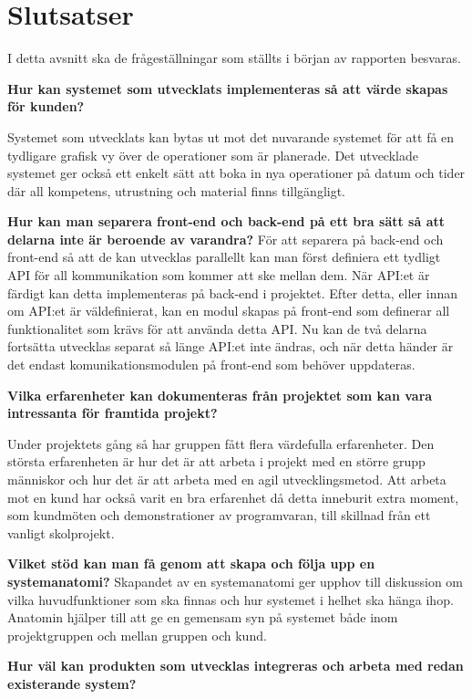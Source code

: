 \chapter{Slutsatser}
I detta avsnitt ska de frågeställningar som ställts i början av rapporten besvaras.

\textbf{Hur kan systemet som utvecklats implementeras så att värde skapas för kunden?}

Systemet som utvecklats kan bytas ut mot det nuvarande systemet för att få en tydligare grafisk vy över de operationer som är planerade. Det utvecklade systemet ger också ett enkelt sätt att boka in nya operationer på datum och tider där all kompetens, utrustning och material finns tillgängligt.

\textbf{Hur kan man separera front-end och back-end på ett bra sätt så att delarna inte är beroende av varandra?}
För att separera på back-end och front-end så att de kan utvecklas parallellt kan man först definiera ett tydligt API för all kommunikation som kommer att ske mellan dem. När API:et är färdigt kan detta implementeras på back-end i projektet. Efter detta, eller innan om API:et är väldefinierat, kan en modul skapas på front-end som definerar all funktionalitet som krävs för att använda detta API. Nu kan de två delarna fortsätta utvecklas separat så länge API:et inte ändras, och när detta händer är det endast komunikationsmodulen på front-end som behöver uppdateras.

\textbf{Vilka erfarenheter kan dokumenteras från projektet som kan vara intressanta för framtida projekt?}

Under projektets gång så har gruppen fått flera värdefulla erfarenheter. Den största erfarenheten är hur det är att arbeta i projekt med en större grupp människor och hur det är att arbeta med en agil utvecklingsmetod. Att arbeta mot en kund har också varit en bra erfarenhet då detta inneburit extra moment, som kundmöten och demonstrationer av programvaran, till skillnad från ett vanligt skolprojekt.

\textbf{Vilket stöd kan man få genom att skapa och följa upp en systemanatomi?}
Skapandet av en systemanatomi ger upphov till diskussion om vilka huvudfunktioner som ska finnas och hur systemet i helhet ska hänga ihop. Anatomin hjälper till att ge en gemensam syn på systemet både inom projektgruppen och mellan gruppen och kund.   

\textbf{Hur väl kan produkten som utvecklas integreras och arbeta med redan existerande system?}